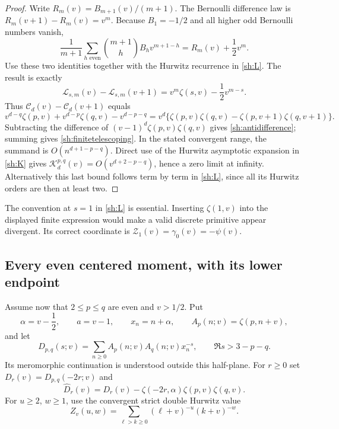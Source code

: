 \documentclass[11pt]{article}
\theoremstyle{definition}
\theoremstyle{remark}
\numberwithin{equation}{section}
\begin{document}
\begin{proof}
Write $R_m(v)=B_{m+1}(v)/(m+1)$.  The Bernoulli difference law is
$R_m(v+1)-R_m(v)=v^m$.  Because $B_1=-1/2$ and all higher odd
Bernoulli numbers vanish,
\[
 \frac1{m+1}\sum_{h\text{ even}}
       \binom{m+1}{h}B_hv^{m+1-h}
 =R_m(v)+\frac12v^m.
\]
Use these two identities together with the Hurwitz recurrence in
\eqref{sh:L}.  The result is exactly
\begin{equation}\label{sh:Ldifference}
 \mathcal L_{s,m}(v)-\mathcal L_{s,m}(v+1)
   =v^m\zeta(s,v)-\frac12v^{m-s}.
\end{equation}
Thus $\mathcal C_d(v)-\mathcal C_d(v+1)$ equals
\[
 v^{d-q}\zeta(p,v)+v^{d-p}\zeta(q,v)-v^{d-p-q}
 =v^d\{\zeta(p,v)\zeta(q,v)
              -\zeta(p,v+1)\zeta(q,v+1)\}.
\]
Subtracting the difference of $(v-1)^d\zeta(p,v)\zeta(q,v)$
gives \eqref{sh:antidifference}; summing gives
\eqref{sh:finitetelescoping}.  In the stated convergent range,
the summand is $O(n^{d+1-p-q})$.  Direct use of the Hurwitz
asymptotic expansion in \eqref{sh:K} gives
$\mathcal K_d^{p,q}(v)=O(v^{d+2-p-q})$, hence a zero limit at
infinity.  Alternatively this last bound follows term by term in
\eqref{sh:L}, since all its Hurwitz orders are then at least two.
\end{proof}

The convention at $s=1$ in \eqref{sh:L} is essential.  Inserting
$\zeta(1,v)$ into the displayed finite expression would make a valid
discrete primitive appear divergent.  Its correct coordinate is
$\mathcal Z_1(v)=\gamma_0(v)=-\psi(v)$.

\subsection{Every even centered moment, with its lower endpoint}

Assume now that $2\le p\le q$ are even and $v>1/2$.  Put
\[
 \alpha=v-\frac12,\qquad a=v-1,\qquad x_n=n+\alpha,
 \qquad A_p(n;v)=\zeta(p,n+v),
\]
and let
\begin{equation}\label{sh:D}
 D_{p,q}(s;v)=\sum_{n\ge0}
           A_p(n;v)A_q(n;v)x_n^{-s},
 \qquad \Re s>3-p-q.
\end{equation}
Its meromorphic continuation is understood outside this half-plane.
For $r\ge0$ set $D_r(v)=D_{p,q}(-2r;v)$ and
\begin{equation}\label{sh:Dhat}
 \widehat D_r(v)=D_r(v)
       -\zeta(-2r,\alpha)\zeta(p,v)\zeta(q,v).
\end{equation}
For $u\ge2$, $w\ge1$, use the convergent strict double Hurwitz value
\[
 Z_v(u,w)=\sum_{\ell>k\ge0}
                  (\ell+v)^{-u}(k+v)^{-w}.
\]
\end{document}
